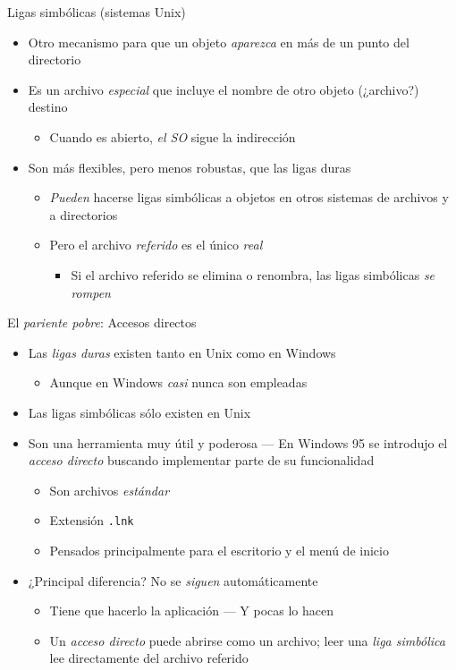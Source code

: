 \documentclass[presentation]{beamer}
\begin{document}
\begin{frame}[label={sec:orga2a0d0a}]{Ligas simbólicas (sistemas Unix)}
\begin{itemize}
\item Otro mecanismo para que un objeto \emph{aparezca} en más de un punto del directorio
\item Es un archivo \emph{especial} que incluye el nombre de otro objeto
(¿archivo?) destino
\begin{itemize}
\item Cuando es abierto, \emph{el SO} sigue la indirección
\end{itemize}
\item Son más flexibles, pero menos robustas, que las ligas duras
\begin{itemize}
\item \emph{Pueden} hacerse ligas simbólicas a objetos en otros sistemas de
archivos y a directorios
\item Pero el archivo \emph{referido} es el único \emph{real}
\begin{itemize}
\item Si el archivo referido se elimina o renombra, las ligas
simbólicas \emph{se rompen}
\end{itemize}
\end{itemize}
\end{itemize}
\end{frame}

\begin{frame}[label={sec:orgc38229b},fragile]{El \emph{pariente pobre}: Accesos directos}
 \begin{itemize}
\item Las \emph{ligas duras} existen tanto en Unix como en Windows
\begin{itemize}
\item Aunque en Windows \emph{casi} nunca son empleadas
\end{itemize}
\item Las ligas simbólicas sólo existen en Unix
\item Son una herramienta muy útil y poderosa — En Windows 95 se introdujo
el \emph{acceso directo} buscando implementar parte de su funcionalidad
\begin{itemize}
\item Son archivos \emph{estándar}
\item Extensión \texttt{.lnk}
\item Pensados principalmente para el escritorio y el menú de inicio
\end{itemize}
\item ¿Principal diferencia? No se \emph{siguen} automáticamente
\begin{itemize}
\item Tiene que hacerlo la aplicación — Y pocas lo hacen
\item Un \emph{acceso directo} puede abrirse como un archivo; leer una \emph{liga
simbólica} lee directamente del archivo referido
\end{itemize}
\end{itemize}
\end{frame}
\end{document}
